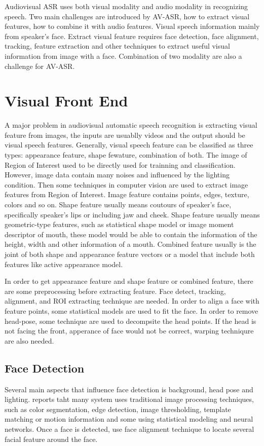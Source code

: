 Audiovisual ASR uses both visual modality and audio modality in recognizing speech. Two main challenges are introduced by AV-ASR, how to extract visual features, how to combine it with audio features. Visual speech information mainly from speaker's face. Extract visual feature requires face detection, face alignment, tracking, feature extraction and other techniques to extract useful visual information from image with a face. Combination of two modality are also a challenge for AV-ASR.
\section{Visual Front End}
A major problem in audiovisual automatic speech recognition is extracting visual feature from images, the inputs are usuablly videos and the output should be visual speech features. Generally, visual speech feature can be classified as three types: appearance feature, shape fewature, combination of both\cite{potamianos2003recent}. The image of Region of Interest used to be directly used for trainning and classification. However, image data contain many noises and influenced by the lighting condition. Then some techniques in computer vision are used to extract image features from Region of Interest. Image feature contains points, edges, texture, colors and so on. Shape feature usually means coutours of speaker's face, specifically speaker's lips or including jaw and cheek. Shape feature usually means geometric-type features, such as statistical shape model or image moment descriptor of mouth, these model would be able to contain the information of the height, width and other information of a mouth. Combined feature usually is the joint of both shape and appearance feature vectors or a model that include both features like active appearance model.

In order to get appearance feature and shape feature or combined feature, there are some preprocessing before extracting feature. Face detect, tracking, alignment, and ROI extracting technique are needed. In order to align a face with feature points, some statistical models are used to fit the face. In order to remove head-pose, some technique are used to decompsite the head points. If the head is not facing the front, apperance of face would not be correct, warping techniqure are also needed.
\subsection{Face Detection}
Several main aspects that influence face detection is background, head pose and lighting. \cite{potamianos2003recent} reports taht many system uses traditional image processing techniques, such as color segmentation, edge detection, image thresholding, template matching or motion information and some using statistical modeling and neural networks. Once a face is detected, use face alignment technique to locate several facial feature around the face.
